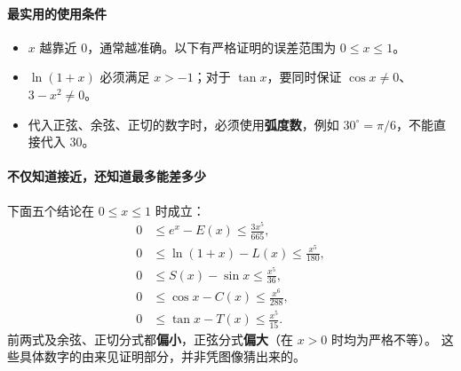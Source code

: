\begin{statementbox}
\paragraph{最实用的使用条件}
\begin{itemize}
\item $x$ 越靠近 $0$，通常越准确。以下有严格证明的误差范围为 $0\le x\le1$。
\item $\ln(1+x)$ 必须满足 $x>-1$；对于 $\tan x$，要同时保证 $\cos x\ne0$、$3-x^2\ne0$。
\item 代入正弦、余弦、正切的数字时，必须使用\textbf{弧度数}，例如 $30^\circ=\pi/6$，不能直接代入 $30$。
\end{itemize}

\paragraph{不仅知道接近，还知道最多能差多少}
下面五个结论在 $0\le x\le1$ 时成立：
\[
\boxed{\begin{aligned}
0&\le e^x-E(x)\le\frac{3x^5}{665},\\
0&\le\ln(1+x)-L(x)\le\frac{x^5}{180},\\
0&\le S(x)-\sin x\le\frac{x^5}{36},\\
0&\le\cos x-C(x)\le\frac{x^6}{288},\\
0&\le\tan x-T(x)\le\frac{x^5}{15}.
\end{aligned}}
\]
前两式及余弦、正切分式都\textbf{偏小}，正弦分式\textbf{偏大}（在 $x>0$ 时均为严格不等）。
这些具体数字的由来见证明部分，并非凭图像猜出来的。
\end{statementbox}
